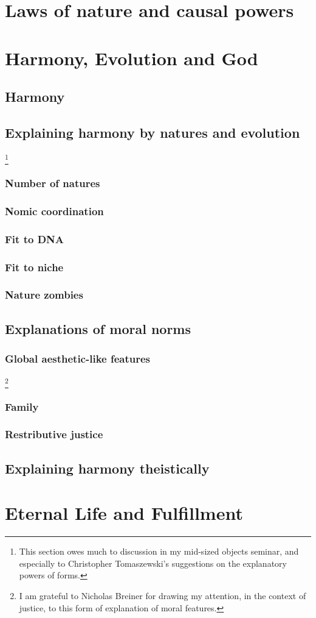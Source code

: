 \def\mychapter{VIII}

\chapter{Laws of nature and causal powers}\label{ch:laws}
\chaptertail

\def\mychapter{IX}

\chapter{Harmony, Evolution and God}\label{ch:God}
\section{Harmony}
\section{Explaining harmony by natures and evolution}
\footnote{This section owes much to discussion in my mid-sized objects seminar, and especially to Christopher Tomaszewski's suggestions on the explanatory powers of forms.}
\subsection{Number of natures}
\subsection{Nomic coordination}
\subsection{Fit to DNA}
\subsection{Fit to niche}
\subsection{Nature zombies}
\section{Explanations of moral norms}
\subsection{Global aesthetic-like features}\footnote{I am grateful to Nicholas Breiner for drawing my attention, in the context of
justice, to this form of explanation of moral features.}
\subsection{Family}
\subsection{Restributive justice}

\section{Explaining harmony theistically}
\chaptertail

\def\mychapter{X}

\chapter{Eternal Life and Fulfillment}\label{ch:eternal-life}
\chaptertail

